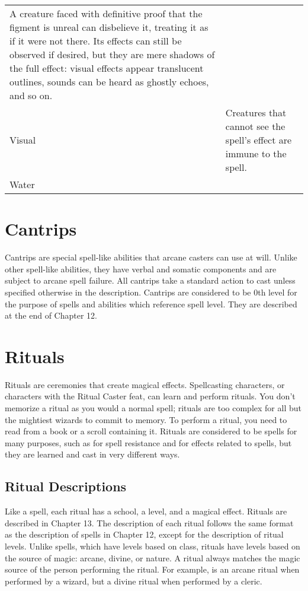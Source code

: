 {\begin{longtabu}{l X}
        A creature faced with definitive proof that the figment is unreal can disbelieve it, treating it as if it were not there. Its effects can still be observed if desired, but they are mere shadows of the full effect: visual effects appear translucent outlines, sounds can be heard as ghostly echoes, and so on. \\
        Visual & Creatures that cannot see the spell's effect are immune to the spell. \\
        Water & \x \\
    \end{longtabu}
    \twocolumn
}

\section{Cantrips}\label{Cantrips}
Cantrips are special spell-like abilities that arcane casters can use at will. Unlike other spell-like abilities, they have verbal and somatic components and are subject to arcane spell failure. All cantrips take a standard action to cast unless specified otherwise in the description. Cantrips are considered to be 0th level for the purpose of spells and abilities which reference spell level. They are described at the end of Chapter 12.

\section{Rituals}\label{Rituals}
Rituals are ceremonies that create magical effects. Spellcasting characters, or characters with the Ritual Caster feat, can learn and perform rituals. You don't memorize a ritual as you would a normal spell; rituals are too complex for all but the mightiest wizards to commit to memory. To perform a ritual, you need to read from a book or a scroll containing it. Rituals are considered to be spells for many purposes, such as for spell resistance and for effects related to spells, but they are learned and cast in very different ways.
\subsection{Ritual Descriptions}
\par Like a spell, each ritual has a school, a level, and a magical effect. Rituals are described in Chapter 13. The description of each ritual follows the same format as the description of spells in Chapter 12, except for the description of ritual levels. Unlike spells, which have levels based on class, rituals have levels based on the source of magic: arcane, divine, or nature. A ritual always matches the magic source of the person performing the ritual. For example,  is an arcane ritual when performed by a wizard, but a divine ritual when performed by a cleric.
